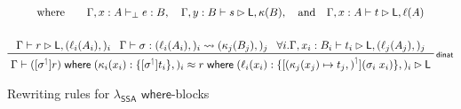 \documentclass[acmsmall,screen,review]{acmart}
\newcommand{\ms}[1]{\ensuremath{\mathsf{#1}}}
\newcommand{\lto}{:}
\newcommand{\where}[2]{#1\;\ms{where}\;#2}
\newcommand{\wbranch}[3]{#1(#2) \lto \{#3\}}
\newcommand{\lupg}[1]{{#1}^\upharpoonleft}
\newcommand{\bhyp}[2]{#1 : #2}
\newcommand{\lhyp}[2]{#1(#2)}
\newcommand{\rle}[1]{{\scriptsize\textsf{#1}}}
\newcommand{\hasty}[4]{#1 \vdash_{#2} #3: {#4}}
\newcommand{\haslb}[3]{#1 \vdash #2 \rhd #3}
\newcommand{\lbsubst}[4]{#1 \vdash #2: #3 \rightsquigarrow #4}
\newcommand{\teqv}{\approx}
\newcommand{\lbeq}[4]{#1 \vdash #2 \teqv #3 \rhd {#4}}
\newcommand{\isotopessa}{\(\lambda_{\ms{SSA}}\)}
\begin{document}
\begin{figure}
\begin{gather*}
      \text{where} \qquad
      {\hasty{\Gamma, \bhyp{x}{A}}{\bot}{e}{B}}, \quad
      {\haslb{\Gamma, \bhyp{y}{B}}{s}{\ms{L}, \kappa(B)}}, \quad \text{and} \quad
      {\haslb{\Gamma, \bhyp{x}{A}}{t}{\ms{L}, \ell(A)}}
      \\
      \\
      \prftree[r]{\rle{dinat}}
        {
          \haslb{\Gamma}{r}{\ms{L}, (\lhyp{\ell_i}{A_i},)_i}
        }{
          \lbsubst{\Gamma}{\sigma}{(\lhyp{\ell_i}{A_i},)_i}{(\lhyp{\kappa_j}{B_j},)_j}
        }{
          \forall i. \haslb{\Gamma, \bhyp{x_i}{B_i}}{t_i}{\ms{L}, (\lhyp{\ell_j}{A_j},)_j}
        }{
          \lbeq{\Gamma}
            {\where{([\lupg{\sigma}]r)}{(\wbranch{\kappa_i}{x_i}{[\lupg{\sigma}]t_i},)_i}}
            {\where{r}
              {(\wbranch{\ell_i}{x_i}{[\lupg{(\kappa_j(x_j) \mapsto t_j,)}](\sigma_i\;x_i)},)_i}}
            {\ms{L}}
        }
  \end{gather*}
  \Description{}
  \caption{Rewriting rules for \isotopessa{} \ms{where}-blocks}
  \label{fig:ssa-where-rules}
\end{figure}
\end{document}
